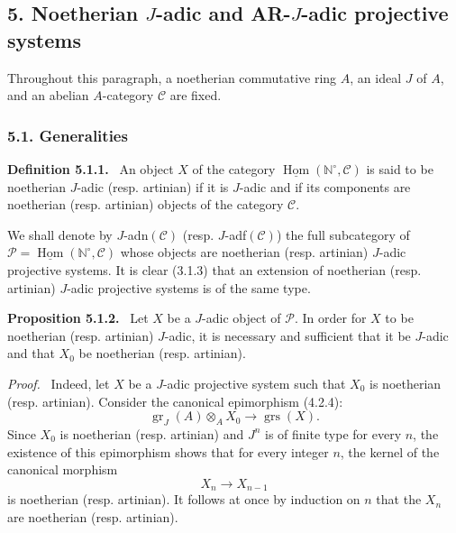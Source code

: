\documentclass[11pt]{article}
\providecommand{\uHom}{\underline{\Hom}}
\newenvironment{statement}[1]{\par\medskip\noindent\textbf{#1.}\ }{\par\medskip}
\newenvironment{prooftext}[1][Proof]{\par\noindent\emph{#1.}\ }{\par\medskip}
\DeclareMathOperator{\Hom}{Hom}
\providecommand{\gr}{\operatorname{gr}}
\providecommand{\Hom}{\operatorname{Hom}}
\providecommand{\gr}{\operatorname{gr}}
\providecommand{\gr}{\operatorname{gr}}
\providecommand{\grs}{\operatorname{grs}}
\providecommand{\Hom}{\operatorname{Hom}}
\begin{document}
\subsection*{5. Noetherian \(J\)-adic and AR-\(J\)-adic projective systems}

Throughout this paragraph, a noetherian commutative ring \(A\), an ideal \(J\) of \(A\), and an abelian \(A\)-category \(\mathcal C\) are fixed.

\subsubsection*{5.1. Generalities}

\begin{statement}{Definition 5.1.1}
An object \(X\) of the category \(\uHom(\mathbb N^\circ,\mathcal C)\) is said to be noetherian \(J\)-adic (resp. artinian) if it is \(J\)-adic and if its components are noetherian (resp. artinian) objects of the category \(\mathcal C\).
\end{statement}

We shall denote by \(J\)-adn\((\mathcal C)\) (resp. \(J\)-adf\((\mathcal C)\)) the full subcategory of
\(\mathcal P=\uHom(\mathbb N^\circ,\mathcal C)\) whose objects are noetherian (resp. artinian) \(J\)-adic projective systems. It is clear (3.1.3) that an extension of noetherian (resp. artinian) \(J\)-adic projective systems is of the same type.

\begin{statement}{Proposition 5.1.2}
Let \(X\) be a \(J\)-adic object of \(\mathcal P\). In order for \(X\) to be noetherian (resp. artinian) \(J\)-adic, it is necessary and sufficient that it be \(J\)-adic and that \(X_0\) be noetherian (resp. artinian).
\end{statement}

\begin{prooftext}
Indeed, let \(X\) be a \(J\)-adic projective system such that \(X_0\) is noetherian (resp. artinian). Consider the canonical epimorphism (4.2.4):
\[
\gr_J(A)\otimes_A X_0\longrightarrow \grs(X).
\]
Since \(X_0\) is noetherian (resp. artinian) and \(J^n\) is of finite type for every \(n\), the existence of this epimorphism shows that for every integer \(n\), the kernel of the canonical morphism
\[
X_n\longrightarrow X_{n-1}
\]
is noetherian (resp. artinian). It follows at once by induction on \(n\) that the \(X_n\) are noetherian (resp. artinian).
\end{prooftext}
\end{document}

